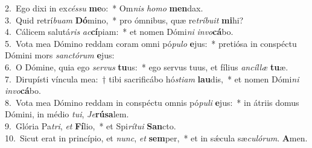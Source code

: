 {2.~}Ego dixi in ex\textit{cés}\textit{su} \textbf{me}o:~* Om\textit{nis} \textit{ho}\textit{mo} \textbf{men}dax.\\
{3.~}Quid retrí\textit{bu}\textit{am} \textbf{Dó}mino,~* pro ómnibus, quæ re\textit{trí}\textit{bu}\textit{it} \textbf{mi}hi?\\
{4.~}Cálicem salutá\textit{ris} \textit{ac}\textbf{cí}piam:~* et nomen Dómi\textit{ni} \textit{in}\textit{vo}\textbf{cá}bo.\\
{5.~}Vota mea Dómino reddam coram omni pó\textit{pu}\textit{lo} \textbf{e}jus:~* pretiósa in conspéctu Dómini mors \textit{san}\textit{ctó}\textit{rum} \textbf{e}jus:\\
{6.~}O Dómine, quia ego \textit{ser}\textit{vus} \textbf{tu}us:~* ego servus tuus, et fílius \textit{an}\textit{cíl}\textit{læ} \textbf{tu}æ.\\
{7.~}Dirupísti víncula mea:~† tibi sacrificábo hó\textit{sti}\textit{am} \textbf{lau}dis,~* et nomen Dómi\textit{ni} \textit{in}\textit{vo}\textbf{cá}bo.\\
{8.~}Vota mea Dómino reddam in conspéctu omnis pó\textit{pu}\textit{li} \textbf{e}jus:~* in átriis domus Dómini, in médio \textit{tu}\textit{i}, \textit{Je}\textbf{rú}\textbf{sa}lem.\\
{9.~}Glória Pa\textit{tri}, \textit{et} \textbf{Fí}lio,~* et Spi\textit{rí}\textit{tu}\textit{i} \textbf{San}cto.\\
{10.~}Sicut erat in princípio, et \textit{nunc}, \textit{et} \textbf{sem}per,~* et in sǽcula sæ\textit{cu}\textit{ló}\textit{rum}. \textbf{A}men.\\
